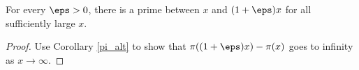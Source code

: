 \begin{corollary}
\label{prime_between}
\leanok
For every $\eps>0$, there is a prime between $x$ and $(1+\eps)x$ for
  all sufficiently large $x$.
\end{corollary}
\begin{proof}
\leanok
Use Corollary \ref{pi_alt} to show that $\pi((1+\eps)x) - \pi(x)$ goes to infinity
  as $x \to \infty$.
\end{proof}
